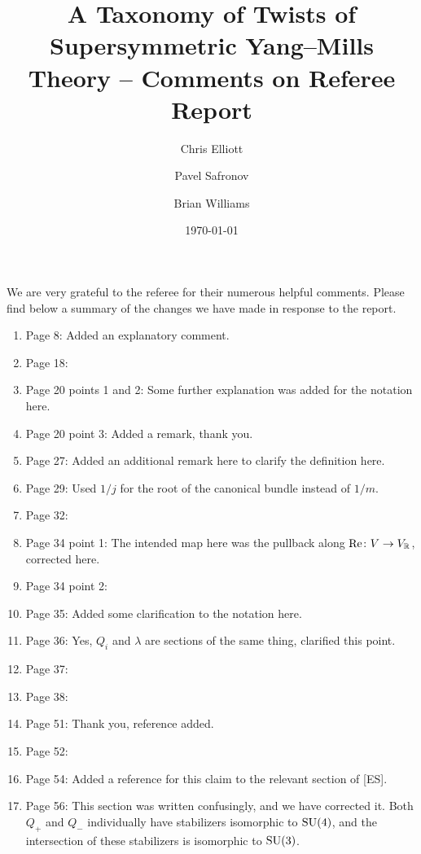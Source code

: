 \documentclass[10pt, oneside]{article}
\title{A Taxonomy of Twists of Supersymmetric Yang--Mills Theory -- Comments on Referee Report}
\author{Chris Elliott\and Pavel Safronov \and Brian Williams}
\date{\today}
\begin{document}
\maketitle

We are very grateful to the referee for their numerous helpful comments.  Please find below a summary of the changes we have made in response to the report.

\begin{enumerate}
 \item Page 8: Added an explanatory comment.
 \item Page 18:
 \item Page 20 points 1 and 2: Some further explanation was added for the notation here.
 \item Page 20 point 3: Added a remark, thank you.
 \item Page 27: Added an additional remark here to clarify the definition here.
 \item Page 29: Used $1/j$ for the root of the canonical bundle instead of $1/m$.
 \item Page 32:
 \item Page 34 point 1: The intended map here was the pullback along $\mathrm{Re} \colon V \to V_\mathbb R$, corrected here. 
 \item Page 34 point 2:
 \item Page 35: Added some clarification to the notation here.
 \item Page 36: Yes, $Q_i$ and $\lambda$ are sections of the same thing, clarified this point. 
 \item Page 37:
 \item Page 38:
 \item Page 51: Thank you, reference added.
 \item Page 52:
 \item Page 54: Added a reference for this claim to the relevant section of [ES].
 \item Page 56: This section was written confusingly, and we have corrected it.  Both $Q_+$ and $Q_-$ individually have stabilizers isomorphic to $\mathrm{SU}(4)$, and the intersection of these stabilizers is isomorphic to $\mathrm{SU}(3)$.
\end{enumerate}

 
\end{document}
